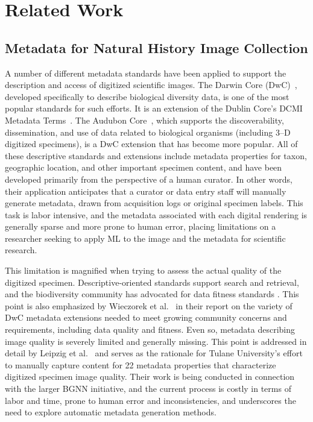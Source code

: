 \documentclass[conference]{IEEEtran}
\begin{document}
\section{Related Work}
\subsection{Metadata for Natural History Image Collection}
A number of different metadata standards have been applied to support the description and access of digitized scientific images. The Darwin Core (DwC)~\cite{biodiv_info_standards}, developed specifically to describe biological diversity data, is one of the most popular standards for such efforts. It is an extension of the Dublin Core's DCMI Metadata Terms~\cite{dc_terms}.
The Audubon Core~\cite{audub_core}, which supports the discoverability, dissemination, and use of data related to biological organisms (including 3--D digitized specimens), is a DwC extension that has become more popular. All of these descriptive standards and extensions include metadata properties for taxon, geographic location, and other important specimen content, and have been developed primarily from the perspective of a human curator. In other words, their application anticipates that a curator or data entry staff will manually generate metadata, drawn from acquisition logs or original specimen labels. This task is labor intensive, and the metadata associated with each digital rendering is generally sparse and more prone to human error, placing limitations on a researcher seeking to apply ML to the image and the metadata for scientific research.

This limitation is magnified when trying to assess the actual quality of the digitized specimen. Descriptive-oriented standards support search and retrieval, and the biodiversity community has advocated for data fitness standards \cite{chapman2020developing}. This point is also emphasized by
Wieczorek et al.~\cite{wieczorek2012darwin} in their report on the variety of DwC metadata extensions needed to meet growing community concerns and
requirements, including data quality and fitness. Even so, metadata describing image quality is severely limited and generally missing. This point is addressed in detail by Leipzig et al.~\cite{leipzig2021biodiversity} and serves as the rationale for Tulane University's effort to manually capture
content for 22 metadata properties that characterize digitized specimen image quality. Their work is being conducted in connection with the larger BGNN initiative, and the current process is costly in terms of labor and time, prone to human error and inconsistencies, and underscores the need to
explore automatic metadata generation methods.
\end{document}
